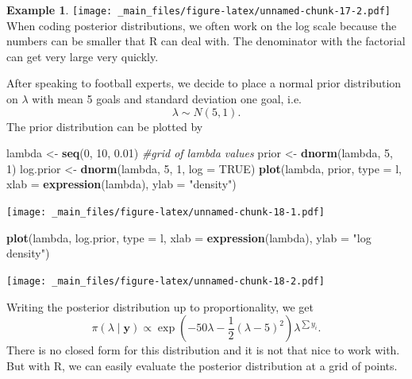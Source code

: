 \documentclass[
]{book}
\newenvironment{Shaded}{\begin{snugshade}}{\end{snugshade}}
\newcommand{\AttributeTok}[1]{\textcolor[rgb]{0.13,0.29,0.53}{#1}}
\newcommand{\CommentTok}[1]{\textcolor[rgb]{0.56,0.35,0.01}{\textit{#1}}}
\newcommand{\ConstantTok}[1]{\textcolor[rgb]{0.56,0.35,0.01}{#1}}
\newcommand{\DecValTok}[1]{\textcolor[rgb]{0.00,0.00,0.81}{#1}}
\newcommand{\FloatTok}[1]{\textcolor[rgb]{0.00,0.00,0.81}{#1}}
\newcommand{\FunctionTok}[1]{\textcolor[rgb]{0.13,0.29,0.53}{\textbf{#1}}}
\newcommand{\NormalTok}[1]{#1}
\newcommand{\OtherTok}[1]{\textcolor[rgb]{0.56,0.35,0.01}{#1}}
\newcommand{\StringTok}[1]{\textcolor[rgb]{0.31,0.60,0.02}{#1}}
\theoremstyle{definition}
\theoremstyle{definition}
\newtheorem{example}{Example}[chapter]
\theoremstyle{definition}
\theoremstyle{definition}
\theoremstyle{remark}
\begin{document}
\begin{example}
\texttt{[image: \_main\_files/figure-latex/unnamed-chunk-17-2.pdf]}
When coding posterior distributions, we often work on the log scale because the numbers can be smaller that R can deal with. The denominator with the factorial can get very large very quickly.

After speaking to football experts, we decide to place a normal prior distribution on \(\lambda\) with mean 5 goals and standard deviation one goal, i.e.
\[
\lambda \sim N(5, 1).
\]
The prior distribution can be plotted by

\begin{Shaded}
\begin{Highlighting}[]
\NormalTok{lambda   }\OtherTok{\textless{}{-}} \FunctionTok{seq}\NormalTok{(}\DecValTok{0}\NormalTok{, }\DecValTok{10}\NormalTok{, }\FloatTok{0.01}\NormalTok{) }\CommentTok{\#grid of lambda values}
\NormalTok{prior    }\OtherTok{\textless{}{-}} \FunctionTok{dnorm}\NormalTok{(lambda, }\DecValTok{5}\NormalTok{, }\DecValTok{1}\NormalTok{)}
\NormalTok{log.prior }\OtherTok{\textless{}{-}} \FunctionTok{dnorm}\NormalTok{(lambda, }\DecValTok{5}\NormalTok{, }\DecValTok{1}\NormalTok{, }\AttributeTok{log =} \ConstantTok{TRUE}\NormalTok{)}
\FunctionTok{plot}\NormalTok{(lambda, prior, }\AttributeTok{type =} \StringTok{\textquotesingle{}l\textquotesingle{}}\NormalTok{, }\AttributeTok{xlab =} \FunctionTok{expression}\NormalTok{(lambda), }\AttributeTok{ylab =} \StringTok{"density"}\NormalTok{)}
\end{Highlighting}
\end{Shaded}

\texttt{[image: \_main\_files/figure-latex/unnamed-chunk-18-1.pdf]}

\begin{Shaded}
\begin{Highlighting}[]
\FunctionTok{plot}\NormalTok{(lambda, log.prior, }\AttributeTok{type =} \StringTok{\textquotesingle{}l\textquotesingle{}}\NormalTok{, }
     \AttributeTok{xlab =} \FunctionTok{expression}\NormalTok{(lambda), }\AttributeTok{ylab =} \StringTok{"log density"}\NormalTok{)}
\end{Highlighting}
\end{Shaded}

\texttt{[image: \_main\_files/figure-latex/unnamed-chunk-18-2.pdf]}

Writing the posterior distribution up to proportionality, we get
\[
\pi(\lambda \mid \boldsymbol{y}) \propto \exp\left(-50\lambda -\frac{1}{2}(\lambda - 5)^2\right)\lambda^{\sum y_i}.
\]
There is no closed form for this distribution and it is not that nice to work with. But with R, we can easily evaluate the posterior distribution at a grid of points.


\end{example}
\end{document}
